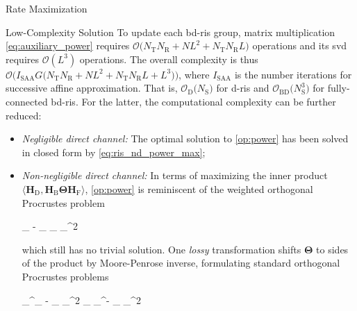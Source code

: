 \documentclass[journal]{IEEEtran}
\begin{document}
\begin{section}{Rate Maximization}
\begin{subsection}{Low-Complexity Solution}
		To update each \gls{bd}-\gls{ris} group, matrix multiplication \eqref{eq:auxiliary_power} requires $\mathcal{O}\bigl(N_\mathrm{T} N_\mathrm{R} + NL^2+N_\mathrm{T} N_\mathrm{R} L\bigr)$ operations and its \gls{svd} requires $\mathcal{O}(L^3)$ operations.
		The overall complexity is thus $\mathcal{O}\bigl(I_\text{SAA} G \bigl(N_\mathrm{T} N_\mathrm{R} + NL^2+N_\mathrm{T} N_\mathrm{R} L + L^3\bigr)\bigr)$, where $I_\text{SAA}$ is the number iterations for successive affine approximation.
		That is, $\mathcal{O}_\mathrm{D}\bigl(N_\mathrm{S}\bigr)$ for \gls{d}-\gls{ris} and $\mathcal{O}_\mathrm{BD}\bigl(N_\mathrm{S}^3\bigr)$ for fully-connected \gls{bd}-\gls{ris}.
		For the latter, the computational complexity can be further reduced:
		\begin{itemize}
			\item \emph{Negligible direct channel:} The optimal solution to \eqref{op:power} has been solved in closed form by \eqref{eq:ris_nd_power_max};
			\item \emph{Non-negligible direct channel:} In terms of maximizing the inner product $\langle \mathbf{H}_\mathrm{D}, \mathbf{H}_\mathrm{B} \mathbf{\Theta} \mathbf{H}_\mathrm{F} \rangle$, \eqref{op:power} is reminiscent of the weighted orthogonal Procrustes problem \cite{Gower2004}
			\begin{mini!}
				{\scriptstyle{\mathbf{\Theta}}}{\lVert {}_ - _ \mathbf{\Theta} _\mathrm{F} \rVert _^2}{\label{op:procrustes_wt}}{}
			\end{mini!}
			which still has no trivial solution.
			One \emph{lossy} transformation \cite{Bell2003} shifts $\mathbf{\Theta}$ to sides of the product by Moore-Penrose inverse, formulating standard orthogonal Procrustes problems
			\begin{mini!}
				{\scriptstyle{\mathbf{\Theta}}}{\lVert {}_^\dagger {}_ - \mathbf{\Theta} _\mathrm{F} \rVert _^2  \lVert \mathbf{H}_ _^\dagger - _ \mathbf{\Theta} \rVert _^2}{\label{op:procrustes}}{}

\end{mini!}
\end{itemize}
\end{subsection}
\end{section}
\end{document}
